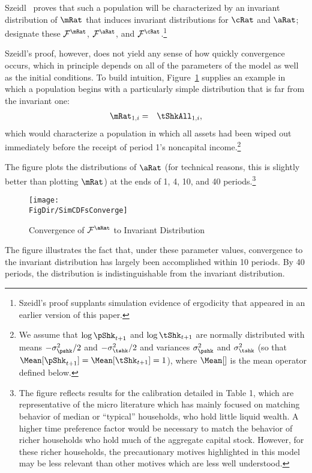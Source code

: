 \documentclass[titlepage]{\econtex}\providecommand{\texname}{BufferStockTheory}%
\providecommand{\FigDir}{Figures}
\renewcommand{\FigDir}{Code/Python/Figures}
\begin{document}
Szeidl~\citeyearpar{szeidlInvariant} proves that such a
population will be characterized by an invariant
distribution of $\mRat$ that induces invariant distributions for $\cRat$ and
$\aRat$; designate these $\mathcal{F}^{\mRat}$, $\mathcal{F}^{\aRat}$, and
$\mathcal{F}^{\cRat}$.\footnote{Szeidl's proof supplants simulation evidence of ergodicity
that appeared in an earlier version of this paper.}

Szeidl's proof, however, does not yield any sense of how quickly
convergence occurs, which in principle depends on all of the
parameters of the model as well as the initial conditions.  To build
intuition, Figure~\ref{fig:simcdfsconverge} supplies an example in
which a population begins with a particularly simple distribution that
is far from the invariant one:
\begin{eqnarray*}
  \mRat_{1,i} & = & \tShkAll_{1,i},
\end{eqnarray*}
which would characterize a population in which all assets had been
wiped out immediately before the receipt of period 1's noncapital
income.\footnote{We assume that $\log\pShk_{t+1}$ and
  $\log\tShk_{t+1}$ are normally distributed with means
  $-\sigma^{2}_{\pshk}/2$ and $-\sigma^{2}_{\tshk}/2$ and variances
  $\sigma^{2}_{\pshk}$ and $\sigma^{2}_{\tshk}$ (so that
  $\Mean[\pShk_{t+1}]=\Mean[\tShk_{t+1}]=1$), where $\Mean[]$ is the mean operator defined below.}


The figure plots the
distributions of $\aRat$ (for technical reasons, this is slightly
better than plotting $\mRat$) at the ends of 1, 4, 10, and 40
periods.\footnote{The figure reflects results for the calibration
  detailed in Table 1, which are representative of the micro
  literature which has mainly focused on matching behavior of median
  or ``typical'' households, who hold little liquid wealth.  A higher
  time preference factor would be necessary to match the behavior of
  richer households who hold much of the aggregate capital stock.
  However, for these richer households, the precautionary motives
  highlighted in this model may be less relevant than other motives
  which are less well understood.}


\begin{figure}[h]
\centerline{\texttt{[image: \\FigDir/SimCDFsConverge]}}
\caption{Convergence of $\mathcal{F}^{\aRat}$ to Invariant Distribution}
\label{fig:simcdfsconverge}
\end{figure}


The figure illustrates the fact that, under these parameter values,
convergence to the invariant distribution has largely been
accomplished within 10 periods.  By 40 periods, the distribution is
indistinguishable from the invariant distribution.
\end{document}
